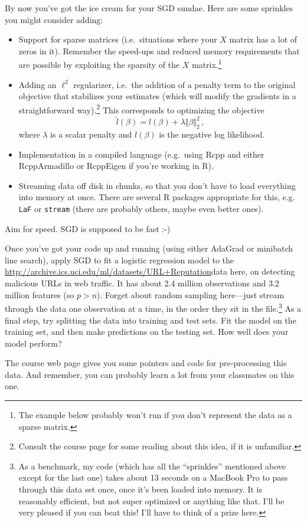 \documentclass{article}
\begin{document}
By now you've got the ice cream for your SGD sundae.  Here are some sprinkles you might consider adding:
\begin{itemize}
\item Support for sparse matrices (i.e.~situations where your $X$ matrix has a lot of zeros in it).  Remember the speed-ups and reduced memory requirements that are possible by exploiting the sparsity of the $X$ matrix.\footnote{The example below probably won't run if you don't represent the data as a sparse matrix. }
\item Adding an $\ell^2$ regularizer, i.e.~the addition of a penalty term to the original objective that stabilizes your estimates (which will modify the gradients in a straightforward way).\footnote{Consult the course page for some reading about this idea, if it is unfamiliar.}  This corresponds to optimizing the objective
$$
\tilde{l}(\beta) = l(\beta) + \lambda \Vert \beta \Vert_2^2 \, ,
$$
where $\lambda$ is a scalar penalty and $l(\beta)$ is the negative log likelihood.
\item Implementation in a compiled language (e.g.~using Rcpp and either RcppArmadillo or RcppEigen if you're working in R).
\item Streaming data off disk in chunks, so that you don't have to load everything into memory at once.  There are several R packages appropriate for this, e.g. \verb|LaF| or \verb|stream| (there are probably others, maybe even better ones).
\end{itemize}

Aim for speed.  SGD is supposed to be fast :-)

Once you've got your code up and running (using either AdaGrad or minibatch line search), apply SGD to fit a logistic regression model to the \url{http://archive.ics.uci.edu/ml/datasets/URL+Reputation}{data here}, on detecting malicious URLs in web traffic.  It has about 2.4 million observations and 3.2 million features (so $p > n$).   Forget about random sampling here---just stream through the data one observation at a time, in the order they sit in the file.\footnote{As a benchmark, my code (which has all the ``sprinkles'' mentioned above except for the last one) takes about 13 seconds on a MacBook Pro to pass through this data set once, once it's been loaded into memory.  It is reasonably efficient, but not super optimized or anything like that.   I'll be very pleased if you can beat this!  I'll have to think of a prize here.}  As a final step, try splitting the data into training and test sets.  Fit the model on the training set, and then make predictions on the testing set.  How well does your model perform?

The course web page gives you some pointers and code for pre-processing this data.  And remember, you can probably learn a lot from your classmates on this one.
\end{document}

